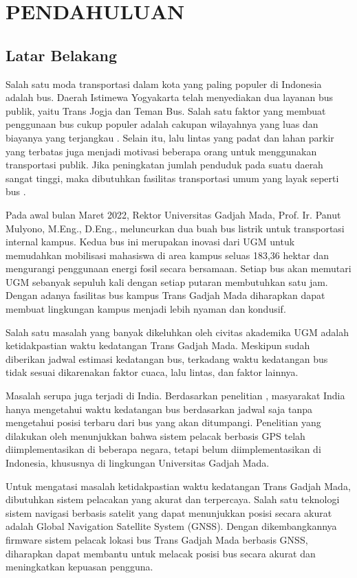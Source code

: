 \chapter{PENDAHULUAN}

\section{Latar Belakang}
Salah satu moda transportasi dalam kota yang paling populer di Indonesia adalah bus. Daerah Istimewa Yogyakarta telah menyediakan dua layanan bus publik, yaitu Trans Jogja dan Teman Bus. Salah satu faktor yang membuat penggunaan bus cukup populer adalah cakupan wilayahnya yang luas dan biayanya yang terjangkau \cite{Rohani2013}. Selain itu, lalu lintas yang padat dan lahan parkir yang terbatas juga menjadi motivasi beberapa orang untuk menggunakan transportasi publik. Jika peningkatan jumlah penduduk pada suatu daerah sangat tinggi, maka dibutuhkan fasilitas transportasi umum yang layak seperti bus \cite{Sutandi2015}.

Pada awal bulan Maret 2022, Rektor Universitas Gadjah Mada, Prof. Ir. Panut Mulyono, M.Eng., D.Eng., meluncurkan dua buah bus listrik untuk transportasi internal kampus. Kedua bus ini merupakan inovasi dari UGM untuk memudahkan mobilisasi mahasiswa di area kampus seluas 183,36 hektar dan mengurangi penggunaan energi fosil secara bersamaan. Setiap bus akan memutari UGM sebanyak sepuluh kali dengan setiap putaran membutuhkan satu jam. Dengan adanya fasilitas bus kampus Trans Gadjah Mada diharapkan dapat membuat lingkungan kampus menjadi lebih nyaman dan kondusif.

Salah satu masalah yang banyak dikeluhkan oleh civitas akademika UGM adalah ketidakpastian waktu kedatangan Trans Gadjah Mada. Meskipun sudah diberikan jadwal estimasi kedatangan bus, terkadang waktu kedatangan bus tidak sesuai dikarenakan faktor cuaca, lalu lintas, dan faktor lainnya.

Masalah serupa juga terjadi di India. Berdasarkan penelitian \cite{Sutar2016}, masyarakat India hanya mengetahui waktu kedatangan bus berdasarkan jadwal saja tanpa mengetahui posisi terbaru dari bus yang akan ditumpangi. Penelitian yang dilakukan oleh \cite{Sneha2014} menunjukkan bahwa sistem pelacak berbasis GPS telah diimplementasikan di beberapa negara, tetapi belum diimplementasikan di Indonesia, khususnya di lingkungan Universitas Gadjah Mada.

Untuk mengatasi masalah ketidakpastian waktu kedatangan Trans Gadjah Mada, dibutuhkan sistem pelacakan yang akurat dan terpercaya. Salah satu teknologi sistem navigasi berbasis satelit yang dapat menunjukkan posisi secara akurat adalah Global Navigation Satellite System (GNSS). Dengan dikembangkannya firmware sistem pelacak lokasi bus Trans Gadjah Mada berbasis GNSS, diharapkan dapat membantu untuk melacak posisi bus secara akurat dan meningkatkan kepuasan pengguna.

